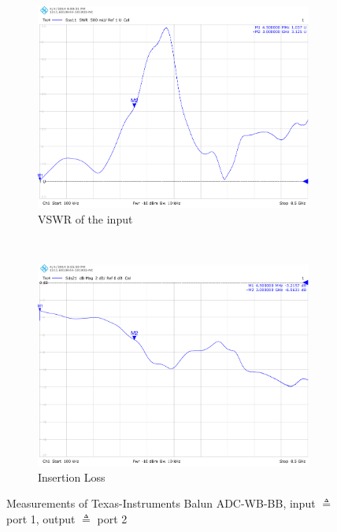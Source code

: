 \begin{figure}[p]
  \centering
  \begin{subfigure}{0.45\textwidth}
    \centering
    \includegraphics[width=\textwidth]{figures/network_analyzer/TI_ADC-WB-BB_Balun_swr_id1}
    \caption{\gls{VSWR} of the input}
  \end{subfigure}
  ~
  \begin{subfigure}{0.45\textwidth}
    \centering
    \includegraphics[width=\textwidth]{figures/network_analyzer/TI_ADC-WB-BB_Balun_insertion_loss_id1}
    \caption{Insertion Loss}
  \end{subfigure}
  \caption{Measurements of Texas-Instruments Balun ADC-WB-BB,
    input $\triangleq$ port 1, output $\triangleq$ port 2}
  \label{fig:comp_wbbb}
\end{figure}

